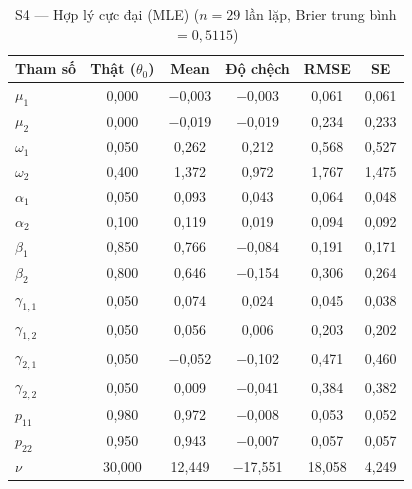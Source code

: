 \documentclass[11pt,a4paper]{article}
\begin{document}
\begin{table}[H]\centering\scriptsize
\caption{S4 --- Hợp lý cực đại (MLE) ($n=29$ lần lặp, Brier trung bình $=0{,}5115$)}
\begin{tabularx}{\textwidth}{l C C C C C}
\toprule
\textbf{Tham số} & \textbf{Thật ($\theta_0$)} & \textbf{Mean} & \textbf{Độ chệch} & \textbf{RMSE} & \textbf{SE} \\
\midrule
$\mu_1$ & 0{,}000 & $-$0{,}003 & $-$0{,}003 & 0{,}061 & 0{,}061 \\
$\mu_2$ & 0{,}000 & $-$0{,}019 & $-$0{,}019 & 0{,}234 & 0{,}233 \\
$\omega_1$ & 0{,}050 & 0{,}262 & 0{,}212 & 0{,}568 & 0{,}527 \\
$\omega_2$ & 0{,}400 & 1{,}372 & 0{,}972 & 1{,}767 & 1{,}475 \\
$\alpha_1$ & 0{,}050 & 0{,}093 & 0{,}043 & 0{,}064 & 0{,}048 \\
$\alpha_2$ & 0{,}100 & 0{,}119 & 0{,}019 & 0{,}094 & 0{,}092 \\
$\beta_1$ & 0{,}850 & 0{,}766 & $-$0{,}084 & 0{,}191 & 0{,}171 \\
$\beta_2$ & 0{,}800 & 0{,}646 & $-$0{,}154 & 0{,}306 & 0{,}264 \\
$\gamma_{1,1}$ & 0{,}050 & 0{,}074 & 0{,}024 & 0{,}045 & 0{,}038 \\
$\gamma_{1,2}$ & 0{,}050 & 0{,}056 & 0{,}006 & 0{,}203 & 0{,}202 \\
$\gamma_{2,1}$ & 0{,}050 & $-$0{,}052 & $-$0{,}102 & 0{,}471 & 0{,}460 \\
$\gamma_{2,2}$ & 0{,}050 & 0{,}009 & $-$0{,}041 & 0{,}384 & 0{,}382 \\
$p_{11}$ & 0{,}980 & 0{,}972 & $-$0{,}008 & 0{,}053 & 0{,}052 \\
$p_{22}$ & 0{,}950 & 0{,}943 & $-$0{,}007 & 0{,}057 & 0{,}057 \\
$\nu$ & 30{,}000 & 12{,}449 & $-$17{,}551 & 18{,}058 & 4{,}249 \\
\bottomrule
\end{tabularx}
\end{table}
\end{document}

